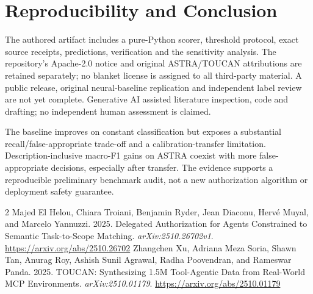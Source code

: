\documentclass[sigconf,nonacm]{acmart}
\begin{document}
\section{Reproducibility and Conclusion}
The authored artifact includes a pure-Python scorer, threshold protocol, exact source receipts, predictions, verification and the sensitivity analysis. The repository's Apache-2.0 notice and original ASTRA/TOUCAN attributions are retained separately; no blanket license is assigned to all third-party material. A public release, original neural-baseline replication and independent label review are not yet complete. Generative AI assisted literature inspection, code and drafting; no independent human assessment is claimed.

The baseline improves on constant classification but exposes a substantial recall/false-appropriate trade-off and a calibration-transfer limitation. Description-inclusive macro-F1 gains on ASTRA coexist with more false-appropriate decisions, especially after transfer. The evidence supports a reproducible preliminary benchmark audit, not a new authorization algorithm or deployment safety guarantee.

\begin{thebibliography}{2}
 Majed El Helou, Chiara Troiani, Benjamin Ryder, Jean Diaconu, Herv\'e Muyal, and Marcelo Yannuzzi. 2025. Delegated Authorization for Agents Constrained to Semantic Task-to-Scope Matching. \emph{arXiv:2510.26702v1}. \url{https://arxiv.org/abs/2510.26702}
 Zhangchen Xu, Adriana Meza Soria, Shawn Tan, Anurag Roy, Ashish Sunil Agrawal, Radha Poovendran, and Rameswar Panda. 2025. TOUCAN: Synthesizing 1.5M Tool-Agentic Data from Real-World MCP Environments. \emph{arXiv:2510.01179}. \url{https://arxiv.org/abs/2510.01179}
\end{thebibliography}
\end{document}
